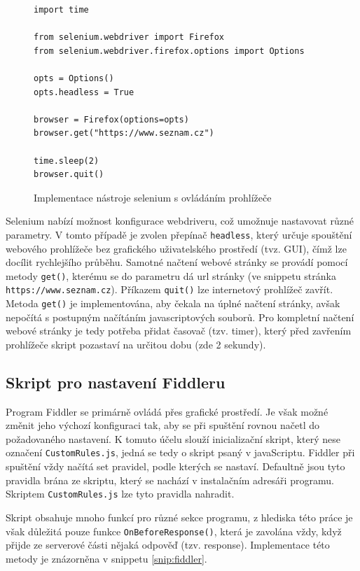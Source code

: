 \documentclass[thesis=M,czech,hidelinks]{FITthesis}[2013/05/06]
\begin{document}
\begin{figure}[h]               
\begin{verbatim}
import time

from selenium.webdriver import Firefox
from selenium.webdriver.firefox.options import Options

opts = Options()
opts.headless = True

browser = Firefox(options=opts)
browser.get("https://www.seznam.cz")

time.sleep(2)
browser.quit()
\end{verbatim}      
\caption{Implementace nástroje selenium s ovládáním prohlížeče}
\label{snip:selenium}
\end{figure}
Selenium nabízí možnost konfigurace webdriveru, což umožnuje nastavovat různé parametry. V tomto případě je zvolen přepínač \texttt{headless}, který určuje spouštění webového prohlížeče bez grafického uživatelského prostředí (tvz. GUI), čímž lze docílit rychlejšího průběhu. Samotné načtení webové stránky se provádí pomocí metody \texttt{get()}, kterému se do parametru dá url stránky (ve snippetu stránka \texttt{https://www.seznam.cz}). Příkazem \texttt{quit()} lze internetový prohlížeč zavřít. Metoda \texttt{get()} je implementována, aby čekala na úplné načtení stránky, avšak nepočítá s postupným načítáním javascriptových souborů. Pro kompletní načtení webové stránky je tedy potřeba přidat časovač (tzv. timer), který před zavřením prohlížeče skript pozastaví na určitou dobu (zde 2 sekundy).




\subsection{Skript pro nastavení Fiddleru}\label{sec:fiddler_setup}
Program Fiddler se primárně ovládá přes grafické prostředí. Je však možné změnit jeho výchozí konfiguraci tak, aby se při spuštění rovnou načetl do požadovaného nastavení. K tomuto účelu slouží inicializační skript, který nese označení \texttt{CustomRules.js}, jedná se tedy o skript psaný v javaScriptu. Fiddler při spuštění vždy načítá set pravidel, podle kterých se nastaví. Defaultně jsou tyto pravidla brána ze skriptu, který se nachází v instalačním adresáři programu. Skriptem \texttt{CustomRules.js} lze tyto pravidla nahradit.

Skript obsahuje mnoho funkcí pro různé sekce programu, z hlediska této práce je však důležitá pouze funkce \texttt{OnBeforeResponse()}, která je zavolána vždy, když přijde ze serverové části nějaká odpověď (tzv. response). Implementace této metody je znázorněna v snippetu \ref{snip:fiddler}.
\end{document}
